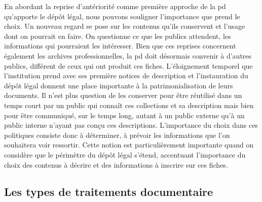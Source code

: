 En abordant la reprise d'antériorité comme première approche de la \gls{pd} qu'apporte le dépôt légal, nous pouvons souligner l'importance que prend le choix. Un nouveau regard se pose sur les contenus qu'ils conservent et l'usage dont on pourrait en faire. On questionne ce que les publics attendent, les informations qui pourraient les intéresser. Bien que ces reprises concernent également les archives professionnelles, la \gls{pd} doit désormais convenir à d'autres publics, différent de ceux qui ont produit ces fiches. L'éloignement temporel que l'institution prend avec ses première notices de description et l'instauration du dépôt légal donnent une place importante à la patrimonialisation de leurs documents. Il n'est plus question de les conserver pour être réutilisé dans un temps court par un public qui connaît ces collections et sa description mais bien pour être communiqué, sur le temps long, autant à un public externe qu'à un public interne n'ayant pas conçu ces descriptions. L'importance du choix dans ces politiques consiste donc à déterminer, à prévoir les informations que l'on souhaitera voir ressortir. Cette notion est particulièrement importante quand on considère que le périmètre du dépôt légal s'étend, accentuant l'importance du choix des contenus à décrire et des informations à inscrire sur ces fiches. 

\subsection{Les types de traitements documentaire}

